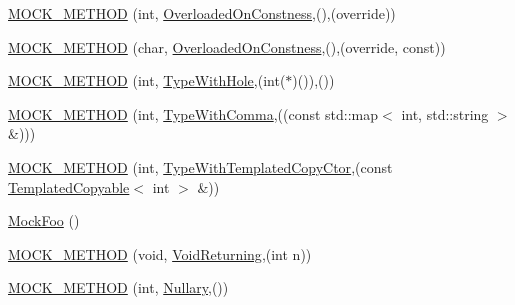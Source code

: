 \begin{DoxyCompactItemize}
\item 
\mbox{\hyperlink{classtesting_1_1gmock__function__mocker__test_1_1_mock_foo_a57a7faaeec9d76031292fa532c35c0c6}{M\+O\+C\+K\+\_\+\+M\+E\+T\+H\+OD}} (int, \mbox{\hyperlink{classtesting_1_1gmock__function__mocker__test_1_1_foo_interface_a94e43dbddc176d1702a7a7d7281f2642}{Overloaded\+On\+Constness}},(),(override))
\item 
\mbox{\hyperlink{classtesting_1_1gmock__function__mocker__test_1_1_mock_foo_a83b1f88fdda3669b8c600daee345bbbc}{M\+O\+C\+K\+\_\+\+M\+E\+T\+H\+OD}} (char, \mbox{\hyperlink{classtesting_1_1gmock__function__mocker__test_1_1_foo_interface_a94e43dbddc176d1702a7a7d7281f2642}{Overloaded\+On\+Constness}},(),(override, const))
\item 
\mbox{\hyperlink{classtesting_1_1gmock__function__mocker__test_1_1_mock_foo_a0a0a46aa356c5f7314a37fc1a4d16720}{M\+O\+C\+K\+\_\+\+M\+E\+T\+H\+OD}} (int, \mbox{\hyperlink{classtesting_1_1gmock__function__mocker__test_1_1_foo_interface_aa14850645cd7a5462480f1717df5153c}{Type\+With\+Hole}},(int($\ast$)()),())
\item 
\mbox{\hyperlink{classtesting_1_1gmock__function__mocker__test_1_1_mock_foo_ab6c0fd6e1285132fb787053cd89ec5ab}{M\+O\+C\+K\+\_\+\+M\+E\+T\+H\+OD}} (int, \mbox{\hyperlink{classtesting_1_1gmock__function__mocker__test_1_1_foo_interface_af1f1d96db798fadbf53fbd886e7c738e}{Type\+With\+Comma}},((const std\+::map$<$ int, std\+::string $>$ \&)))
\item 
\mbox{\hyperlink{classtesting_1_1gmock__function__mocker__test_1_1_mock_foo_a887e304dcf8658b35634a7a547fad991}{M\+O\+C\+K\+\_\+\+M\+E\+T\+H\+OD}} (int, \mbox{\hyperlink{classtesting_1_1gmock__function__mocker__test_1_1_foo_interface_af9e3190c69647229baed1dba41c2fdf8}{Type\+With\+Templated\+Copy\+Ctor}},(const \mbox{\hyperlink{classtesting_1_1gmock__function__mocker__test_1_1_templated_copyable}{Templated\+Copyable}}$<$ int $>$ \&))
\item 
\mbox{\hyperlink{classtesting_1_1gmock__function__mocker__test_1_1_mock_foo_acbbfc5fb080409c8925bc8be2fa6fec4}{Mock\+Foo}} ()
\item 
\mbox{\hyperlink{classtesting_1_1gmock__function__mocker__test_1_1_mock_foo_aa51bd02d682a33eeafaa297c1967455b}{M\+O\+C\+K\+\_\+\+M\+E\+T\+H\+OD}} (void, \mbox{\hyperlink{classtesting_1_1gmock__function__mocker__test_1_1_foo_interface_ab62327ee683b362d9e5579266b74a09c}{Void\+Returning}},(int n))
\item 
\mbox{\hyperlink{classtesting_1_1gmock__function__mocker__test_1_1_mock_foo_aeed9392b4906326c2e5ec651ea9155ca}{M\+O\+C\+K\+\_\+\+M\+E\+T\+H\+OD}} (int, \mbox{\hyperlink{classtesting_1_1gmock__function__mocker__test_1_1_foo_interface_a9440f75381e8a44977c2caee7914098f}{Nullary}},())

\end{DoxyCompactItemize}

